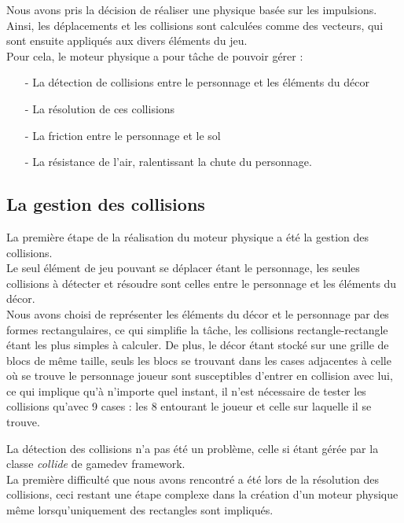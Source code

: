 \documentclass[10pt]{report}
\begin{document}
Nous avons pris la décision de réaliser une physique basée sur les impulsions.
Ainsi, les déplacements et les collisions sont calculées comme des vecteurs, qui sont ensuite appliqués aux divers éléments du jeu.\\
Pour cela, le moteur physique a pour tâche de pouvoir gérer :
\begin{itemize}
  \item[-] La détection de collisions entre le personnage et les éléments du décor
  \item[-] La résolution de ces collisions
  \item[-] La friction entre le personnage et le sol
  \item[-] La résistance de l'air, ralentissant la chute du personnage.
\end{itemize}

\subsection{La gestion des collisions}
La première étape de la réalisation du moteur physique a été la gestion des collisions.\\
Le seul élément de jeu pouvant se déplacer étant le personnage, les seules collisions à détecter et résoudre sont celles entre le personnage et les éléments du décor.\\
Nous avons choisi de représenter les éléments du décor et le personnage par des formes rectangulaires, ce qui simplifie la tâche, les collisions rectangle-rectangle étant les plus simples à calculer.
De plus, le décor étant stocké sur une grille de blocs de même taille, seuls les blocs se trouvant dans les cases adjacentes à celle où se trouve le personnage joueur sont susceptibles d'entrer en collision avec lui, ce qui implique qu'à n'importe quel instant, il n'est nécessaire de tester les collisions qu'avec 9 cases :
les 8 entourant le joueur et celle sur laquelle il se trouve.\par

La détection des collisions n'a pas été un problème, celle si étant gérée par la classe \emph{collide} de gamedev framework.\\
La première difficulté que nous avons rencontré a été lors de la résolution des collisions, ceci restant une étape complexe dans la création d'un moteur physique même lorsqu'uniquement des rectangles sont impliqués.\par
\end{document}
